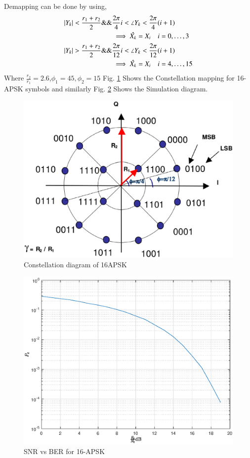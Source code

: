 \documentclass[journal,12pt,twocolumn]{IEEEtran}
\begin{document}
Demapping can be done by using,
\begin{align}
\left\vert Y_k\right\vert<\frac{r_1+r_2}{2} \&\& & \frac{2\pi }{4}i < \angle{Y_k} < \frac{2\pi }{4}(i+1)\\
& \implies \hat{X_k}=X_i \quad i=0,\dots,3\\
\left\vert Y_k\right\vert>\frac{r_1+r_2}{2} \&\& & \frac{2\pi }{12}i < \angle{Y_k} < \frac{2\pi }{12}(i+1)\\
& \implies \hat{X_k}=X_i \quad i=4,\dots,15
\end{align}
Where $\frac{r_2}{r_1}=2.6$,$\phi_1=45,\phi_2=15$
Fig. \ref{fig:16apsk} Shows the Constellation mapping for 16-APSK symbols and similarly Fig. \ref{fig:16apsk1} Shows the Simulation diagram.
%
\begin{figure}[!ht]
\begin{center}
\includegraphics[width=\columnwidth]{./figs/16apsk}
\end{center}
\caption{Constellation diagram of 16APSK}
\label{fig:16apsk}
\end{figure}
%
\begin{figure}[!ht]
\begin{center}
\includegraphics[width=\columnwidth]{./figs/apsk16}
\end{center}
\caption{SNR vs BER for 16-APSK}
\label{fig:16apsk1}
\end{figure}
%
\end{document}
